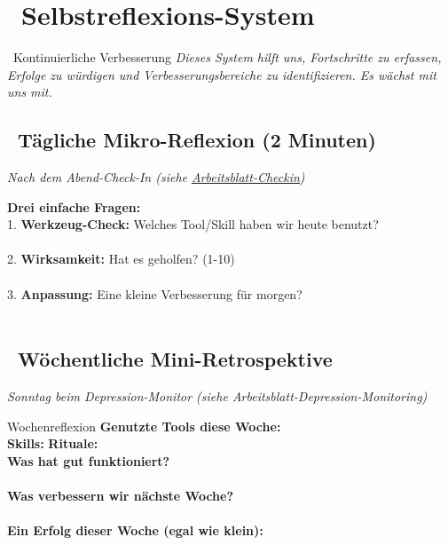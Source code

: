 \newpage
\section*{\textcolor{ctmmPurple}{\faChartLine~Selbstreflexions-System}}
\label{sec:feedback}
\label{sec:selbstreflexion}

\begin{ctmmPurpleBox}{\faSync~Kontinuierliche Verbesserung}
\textit{Dieses System hilft uns, Fortschritte zu erfassen, Erfolge zu würdigen und Verbesserungsbereiche zu identifizieren. Es wächst mit uns mit.}
\end{ctmmPurpleBox}

\subsection*{\faCalendar~Tägliche Mikro-Reflexion (2 Minuten)}
\textit{Nach dem Abend-Check-In (siehe \hyperref[sec:checkin]{Arbeitsblatt-Checkin})}

\textbf{Drei einfache Fragen:}\\[0.3cm]
1. \textbf{Werkzeug-Check:} Welches Tool/Skill haben wir heute benutzt?\\
\\[0.3cm]

2. \textbf{Wirksamkeit:} Hat es geholfen? (1-10)\\
\\[0.3cm]

3. \textbf{Anpassung:} Eine kleine Verbesserung für morgen?\\
\\[0.5cm]

\subsection*{\faCalendar~Wöchentliche Mini-Retrospektive}
\textit{Sonntag beim Depression-Monitor (siehe Arbeitsblatt-Depression-Monitoring)}

\begin{ctmmYellowBox}{Wochenreflexion}
\textbf{Genutzte Tools diese Woche:}\\
 \quad \textbf{Skills:}  \quad \textbf{Rituale:} \\[0.3cm]

\textbf{Was hat gut funktioniert?}\\
\\[0.3cm]

\textbf{Was verbessern wir nächste Woche?}\\
\\[0.3cm]

\textbf{Ein Erfolg dieser Woche (egal wie klein):}\\
\end{ctmmYellowBox}

